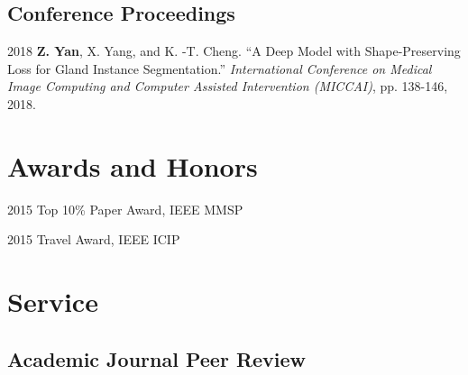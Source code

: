 \documentclass[12pt,letterpaper]{report}
\begin{document}
	
	
	\subsection*{Conference Proceedings}
	
	\begin{tablist}
		
		\item[2018] \tab \textbf{Z. Yan}, X. Yang, and K. -T. Cheng. \enquote{A Deep Model with Shape-Preserving Loss for Gland Instance Segmentation.} \textit{International Conference on Medical Image Computing and Computer Assisted Intervention (MICCAI)}, pp. 138-146, 2018.
		
%		
		
	\end{tablist}


	
	\section*{Awards and Honors}
	
	\begin{tablist}
		
		\item[2015] \tab Top 10\% Paper Award, IEEE MMSP
		
		\item[2015] \tab Travel Award, IEEE ICIP
		
	\end{tablist}
	
	
	
	\section*{Service}
	
	\subsection*{Academic Journal Peer Review}
	
\end{document}
